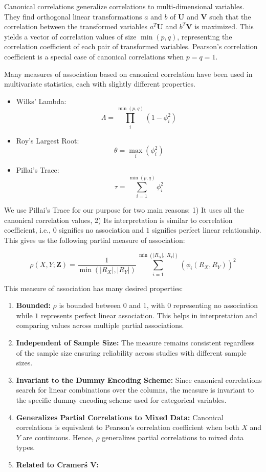 \documentclass[letterpaper]{article} %
\begin{document}
Canonical correlations generalize correlations to multi-dimensional variables. They
find orthogonal linear transformations $ a $ and $ b $ of $ \bm{U} $ and $ \bm{V} $
such that the correlation between the transformed variables $ a^T \bm{U} $ and 
$ b^T \bm{V} $ is maximized. This yields a vector of correlation values of 
size $ \min(p, q) $, representing the correlation coefficient of each pair of 
transformed variables. Pearson's correlation coefficient is a special case of 
canonical correlations when $ p = q = 1 $.

Many measures of association based on canonical correlation have been used in
multivariate statistics, each with slightly different properties.
\begin{itemize}
	\item Wilks' Lambda:
		$$ \Lambda = \prod_{i}^{\min(p, q)} (1 - \phi_i^2) $$
	\item Roy's Largest Root: 
		$$ \theta = \max_i(\phi_i^2) $$
	\item Pillai's Trace: 
		$$ \tau = \sum_{i=1}^{\min(p, q)} \phi_i^2 $$
\end{itemize}

We use Pillai's Trace for our purpose for two main reasons: 1) It uses all the
canonical correlation values, 2) Its interpretation is similar to correlation
coefficient, i.e., $ 0 $ signifies no association and $ 1 $ signifies perfect
linear relationship. This gives us the following partial measure of
association:

\begin{equation}
	\rho(X, Y; \bm{Z}) = \frac{1}{\min(\rvert R_X \rvert, \rvert R_Y \rvert)}
	\sum_{i=1}^{\min(\rvert R_X \rvert, \rvert R_Y \rvert)} (\phi_i(R_X, R_Y))^2
\end{equation}

This measure of association has many desired properties:

\begin{enumerate}
	\item \textbf{Bounded: } $ \rho $ is bounded between $ 0 $ and $ 1 $,
		with $ 0 $ representing no association while $ 1 $ represents
		perfect linear association. This helps in interpretation and
		comparing values across multiple partial associations.
	\item \textbf{Independent of Sample Size: } The measure remains consistent
		regardless of the sample size ensuring reliability across 
		studies with different sample sizes.
	\item \textbf{Invariant to the Dummy Encoding Scheme: } Since canonical
		correlations search for linear combinations over the columns,
		the measure is invariant to the specific dummy encoding
		scheme used for categorical variables.
	\item \textbf{Generalizes Partial Correlations to Mixed Data: }
		Canonical correlations is equivalent to Pearson's correlation coefficient
		when both $ X $ and $ Y $ are continuous. Hence, $ \rho $ generalizes
		partial correlations to mixed data types.
	\item \textbf{Related to Cramer\'s V: } 
\end{enumerate}
\end{document}
